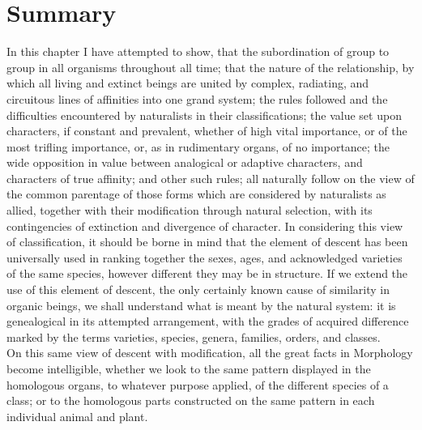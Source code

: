 \section{Summary}
\indent In this chapter I have attempted to show, that the subordination of group to group in all organisms throughout all time; that the nature of the relationship, by which all living and extinct beings are united by complex, radiating, and circuitous lines of affinities into one grand system; the rules followed and the difficulties encountered by naturalists in their classifications; the value set upon characters, if constant and prevalent, whether of high vital importance, or of the most trifling importance, or, as in rudimentary organs, of no importance; the wide opposition in value between analogical or adaptive characters, and characters of true affinity; and other such rules; all naturally follow on the view of the common parentage of those forms which are considered by naturalists as allied, together with their modification through natural selection, with its contingencies of extinction and divergence of character. In considering this view of classification, it should be borne in mind that the element of descent has been universally used in ranking together the sexes, ages, and acknowledged varieties of the same species, however different they may be in structure. If we extend the use of this element of descent, the only certainly known cause of similarity in organic beings, we shall understand what is meant by the natural system: it is genealogical in its attempted arrangement, with the grades of acquired difference marked by the terms varieties, species, genera, families, orders, and classes.~\\
\indent On this same view of descent with modification, all the great facts in Morphology become intelligible, whether we look to the same pattern displayed in the homologous organs, to whatever purpose applied, of the different species of a class; or to the homologous parts constructed on the same pattern in each individual animal and plant.~\\
